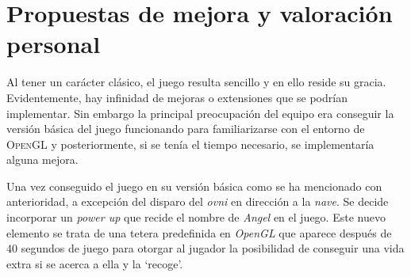 \section{Propuestas de mejora y valoración personal}
Al tener un carácter clásico, el juego resulta sencillo y en ello reside su gracia. Evidentemente, hay infinidad de mejoras o extensiones que se podrían implementar. Sin embargo la principal preocupación del equipo era conseguir la versión básica del juego funcionando para familiarizarse con el entorno de \textsc{OpenGL} y posteriormente, si se tenía el tiempo necesario, se implementaría alguna mejora.

Una vez conseguido el juego en su versión básica como se ha mencionado con anterioridad, a excepción del disparo del \emph{ovni} en dirección a la \emph{nave}. Se decide incorporar un \emph{power up} que recide el nombre de \emph{Angel} en el juego. Este nuevo elemento se trata de una tetera predefinida en \emph{OpenGL} que aparece después de 40 segundos de juego para otorgar al jugador la posibilidad de conseguir una vida extra si se acerca a ella y la ‘recoge’.